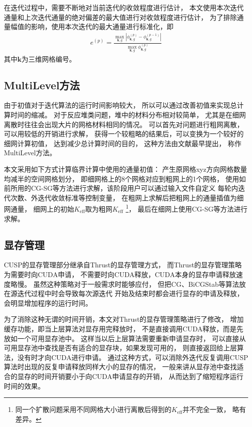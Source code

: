 在迭代过程中，需要不断地对当前迭代的收敛程度进行估计，
本文使用本次迭代通量和上次迭代通量的绝对偏差的最大值进行对收敛程度进行估计，
为了排除通量幅值的影响，使用本次迭代的最大通量进行标准化，即
\begin{align}
e^{(p)}=\frac{\displaystyle \max_{\bm{k},g}\left|\phi_{\bm{k},g}^{(p)}-\phi_{\bm{k},g}^{(p-1)}\right|}
         {\displaystyle \max_{\bm{k},g}\phi_{\bm{k},g}^{(p)}}
\end{align}
其中$\bm{k}$为三维网格编号。


\subsection{MultiLevel方法}
\label{sec:equsolve.multimesh}

由于初值对于迭代算法的运行时间影响较大，
所以可以通过改善初值来实现总计算时间的缩减。
对于反应堆类问题，堆中的材料分布相对较简单，
尤其是在细网离散时往往会出现大片的网格材料相同的情况。
可以首先对问题进行粗网离散，可以用较低的开销进行求解，
获得一个较粗略的结果后，可以变换为一个较好的细网计算初值，
达到减少总计算时间的目的，
这种方法由文献最早提出，
称作MultiLevel方法。

本文采用如下方式计算临界计算中使用的通量初值：
产生原网格xyz方向网格数量均减半的空间网格划分，
即细网格上的8个网格对应到粗网上的1个网格，
使用如前所用的CG-SG等方法进行求解，该阶段用户可以通过输入文件自定义
每轮内迭代次数、外迭代收敛标准等控制变量，
在粗网上求解后把粗网上的通量插值为细网通量，
细网上的初始$K_\mathrm{eff}$取为粗网$K_\mathrm{eff}$%
\footnote{同一个扩散问题采用不同网格大小进行离散后得到的$K_\mathrm{eff}$并不完全一致，
略有差异。}，
最后在细网上使用CG-SG等方法进行求解。

\subsection{显存管理}

CUSP的显存管理部分继承自Thrust的显存管理方式，
而Thrust的显存管理策略为需要时向CUDA申请，
不需要时向CUDA释放，CUDA本身的显存申请释放速度略慢。
虽然这种策略对于一般需求时能够应付，
但把CG、BiCGStab等算法放在源迭代过程中时会导致每次源迭代
开始及结束时都会进行显存的申请及释放，
会明显增加程序的运行时间。

为了消除这种无谓的时间开销，本文对Thrust的显存管理策略进行了修改，
增加缓存功能，即当上层算法对显存用完释放时，
不是直接调用CUDA释放，而是先放如一个可用显存池中。
这样当以后上层算法需要重新申请显存时，
可以直接从可用显存池中查找是否有适合的显存块，如果发现可用的，
则直接返回给上层算法，没有时才向CUDA进行申请。
通过这种方式，可以消除外迭代反复调用CUSP算法时出现的反复申请释放同样大小的显存的情况，
一般来讲从显存池中查找适合的显存的时间开销要小于向CUDA申请显存的开销，
从而达到了缩短程序运行时间的效果。

